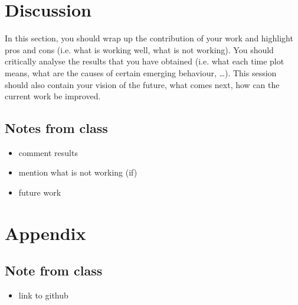 \documentclass[11pt,a4paper]{report}
\begin{document}
	
	
	\section{Discussion}
	In this section, you should wrap up the contribution of your work and highlight pros and cons (i.e. what is working well, what is not working). You should critically analyse the results that you have obtained (i.e. what each time plot means, what are the causes of certain emerging behaviour, …). This session should also contain your vision of the future, what comes next, how can the current work be improved.
	
	\subsection{Notes from class}
	
	\begin{itemize}
		\item comment results
		\item mention what is not working (if)
		\item future work
	\end{itemize}
	
	\section{Appendix}
	\subsection{Note from class}
	\begin{itemize}
		\item link to github
	\end{itemize}
	
\end{document}
